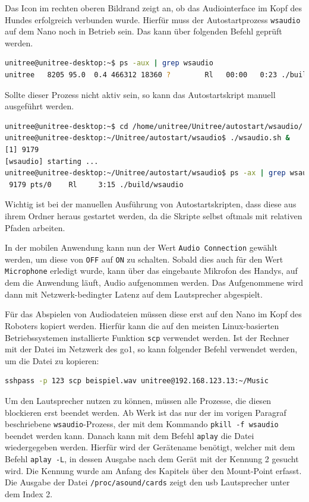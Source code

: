 Das Icon im rechten oberen Bildrand zeigt an, ob das Audiointerface im Kopf des Hundes erfolgreich verbunden wurde.
Hierfür muss der Autostartprozess \texttt{wsaudio} auf dem Nano noch in Betrieb sein.
Das kann über folgenden Befehl geprüft werden.

\begin{lstlisting}[language=Bash]
unitree@unitree-desktop:~$ ps -aux | grep wsaudio
unitree   8205 95.0  0.4 466312 18360 ?        Rl   00:00   0:23 ./build/wsaudio
\end{lstlisting}

\noindent Sollte dieser Prozess nicht aktiv sein, so kann das Autostartskript manuell ausgeführt werden.

\begin{lstlisting}[language=Bash]
unitree@unitree-desktop:~$ cd /home/unitree/Unitree/autostart/wsaudio/
unitree@unitree-desktop:~/Unitree/autostart/wsaudio$ ./wsaudio.sh &
[1] 9179
[wsaudio] starting ...
unitree@unitree-desktop:~/Unitree/autostart/wsaudio$ ps -ax | grep wsaudio
 9179 pts/0    Rl     3:15 ./build/wsaudio
\end{lstlisting}

\noindent Wichtig ist bei der manuellen Ausführung von Autostartskripten, dass diese aus ihrem Ordner heraus gestartet werden,
da die Skripte selbst oftmals mit relativen Pfaden arbeiten.

In der mobilen Anwendung kann nun der Wert \texttt{Audio Connection} gewählt werden, um diese von \texttt{OFF} auf
\texttt{ON} zu schalten.
Sobald dies auch für den Wert \texttt{Microphone} erledigt wurde, kann über das eingebaute Mikrofon des Handys, auf dem
die Anwendung läuft, Audio aufgenommen werden.
Das Aufgenommene wird dann mit Netzwerk-bedingter Latenz auf dem Lautsprecher abgespielt.


Für das Abspielen von Audiodateien müssen diese erst auf den Nano im Kopf des Roboters kopiert werden.
Hierfür kann die auf den meisten Linux-basierten Betriebssystemen installierte Funktion \texttt{scp} verwendet werden.
Ist der Rechner mit der Datei im Netzwerk des \gls{go1}, so kann folgender Befehl verwendet werden, um die Datei zu kopieren:

\begin{lstlisting}[language=Bash]
sshpass -p 123 scp beispiel.wav unitree@192.168.123.13:~/Music
\end{lstlisting}

Um den Lautsprecher nutzen zu können, müssen alle Prozesse, die diesen blockieren erst beendet werden.
Ab Werk ist das nur der im vorigen Paragraf beschriebene \texttt{wsaudio}-Prozess, der mit dem Kommando \texttt{pkill -f wsaudio}
beendet werden kann.
Danach kann mit dem Befehl \texttt{aplay} die Datei wiedergegeben werden.
Hierfür wird der Gerätename benötigt, welcher mit dem Befehl \texttt{aplay -L}, in dessen Ausgabe nach dem Gerät mit
der Kennung \num{2} gesucht wird.
Die Kennung wurde am Anfang des Kapitels über den Mount-Point erfasst.
Die Ausgabe der Datei \texttt{/proc/\allowbreak asound/\allowbreak cards} zeigt den \gls{usb} Lautsprecher unter dem Index \num{2}.

